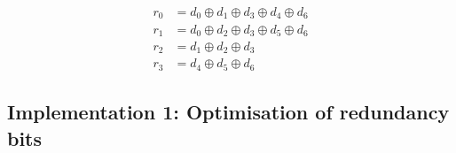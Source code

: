 \begin{equation} \label{equat:hamming_encoder}
    \begin{split}
        r_{0} &= d_{0} \oplus d_{1} \oplus d_{3} \oplus d_{4} \oplus d_{6} \\
        r_{1} &= d_{0} \oplus d_{2} \oplus d_{3} \oplus d_{5} \oplus d_{6} \\
        r_{2} &= d_{1} \oplus d_{2} \oplus d_{3} \\
        r_{3} &= d_{4} \oplus d_{5} \oplus d_{6}
    \end{split}
\end{equation}

\subsection{Implementation 1: Optimisation of redundancy bits}


